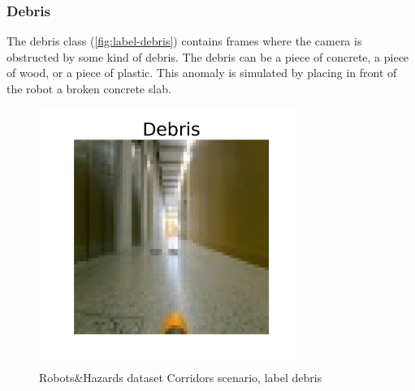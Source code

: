         \subsubsection*{Debris}
            The debris class (\autoref{fig:label-debris}) contains frames where the camera is obstructed by some kind of debris. The debris can be a piece of concrete, a piece of wood, or a piece of plastic. This anomaly is simulated by placing in front of the robot a broken concrete slab. 
            \begin{figure}[H]
                \centering
                \centerline{\includegraphics[width=0.75\textwidth]{img/labels/debris.png}}
                \caption{Robots\&Hazards dataset Corridors scenario, label debris}
                \label{fig:label-debris}
            \end{figure}

